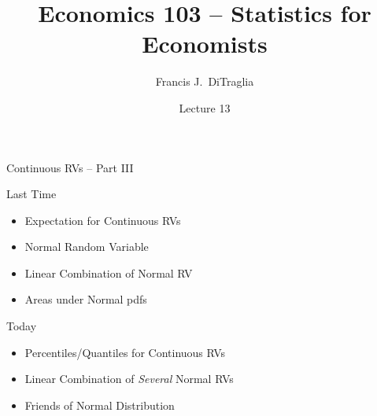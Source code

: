 \documentclass[handout]{beamer}
\title[Econ 103]{Economics 103 -- Statistics for Economists}
\author[F. DiTraglia]{Francis J.\ DiTraglia}
\institute{University of Pennsylvania}
\date{Lecture 13}
\begin{document}
 

\begin{frame}[plain]
	\titlepage 
	

\end{frame} 


\begin{frame}
\Huge \begin{center}
Continuous RVs -- Part III
\end{center}
\end{frame}
\begin{frame}

\begin{block}{Last Time}
\begin{itemize}
	\item Expectation for Continuous RVs
	\item Normal Random Variable
	\item Linear Combination of Normal RV
	\item Areas under Normal pdfs
\end{itemize}
\end{block}

\begin{block}{Today}
	\begin{itemize}
		\item Percentiles/Quantiles for Continuous RVs
		\item Linear Combination of \emph{\alert{Several}} Normal RVs
		\item Friends of Normal Distribution
	\end{itemize}
\end{block}


\end{frame}

\end{document}
